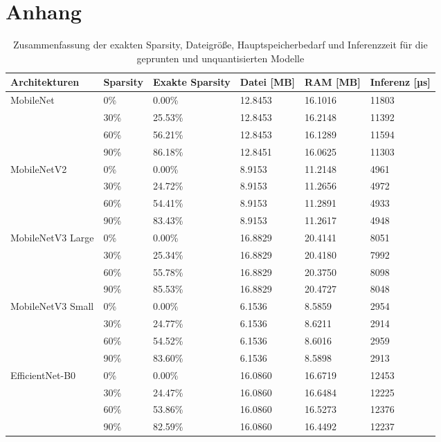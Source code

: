 \chapter{Anhang}

\begin{table}[ht]
\centering
\begin{tabular}{llp{1.5cm}lll}
\toprule
Architekturen & Sparsity & Exakte Sparsity & Datei [MB] &  RAM [MB]  & Inferenz [µs]   \\
\midrule
MobileNet & 0\% &           0.00\% &     12.8453 &   16.1016 &          11803 \\
                & 30\% &          25.53\% &     12.8453 &   16.2148 &          11392 \\
                & 60\% &          56.21\% &     12.8453 &   16.1289 &          11594 \\
                & 90\% &          86.18\% &     12.8451 &   16.0625 &          11303 \\
\midrule
MobileNetV2 & 0\% &           0.00\% &      8.9153 &   11.2148 &           4961 \\
                & 30\% &          24.72\% &      8.9153 &   11.2656 &           4972 \\
                & 60\% &          54.41\% &      8.9153 &   11.2891 &           4933 \\
                & 90\% &          83.43\% &      8.9153 &   11.2617 &           4948 \\
\midrule
MobileNetV3 Large & 0\% &           0.00\% &     16.8829 &   20.4141 &           8051 \\
                & 30\% &          25.34\% &     16.8829 &   20.4180 &           7992 \\
                & 60\% &          55.78\% &     16.8829 &   20.3750 &           8098 \\
                & 90\% &          85.53\% &     16.8829 &   20.4727 &           8048 \\
\midrule
MobileNetV3 Small & 0\% &           0.00\% &      6.1536 &    8.5859 &           2954 \\
                & 30\% &          24.77\% &      6.1536 &    8.6211 &           2914 \\
                & 60\% &          54.52\% &      6.1536 &    8.6016 &           2959 \\
                & 90\% &          83.60\% &      6.1536 &    8.5898 &           2913 \\
\midrule
EfficientNet-B0 & 0\% &           0.00\% &     16.0860 &   16.6719 &          12453 \\
                & 30\% &          24.47\% &     16.0860 &   16.6484 &          12225 \\
                & 60\% &          53.86\% &     16.0860 &   16.5273 &          12376 \\
                & 90\% &          82.59\% &     16.0860 &   16.4492 &          12237 \\
\bottomrule
\end{tabular}
\caption{Zusammenfassung der exakten Sparsity, Dateigröße, Hauptspeicherbedarf und Inferenzzeit für die geprunten und unquantisierten Modelle}
\label{tA.1}
\end{table}
